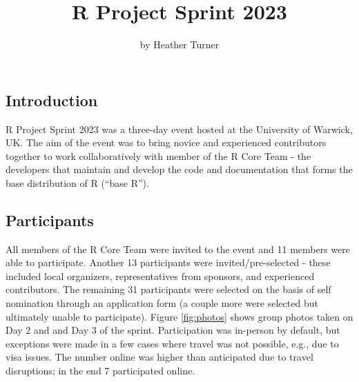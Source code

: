 \title{R Project Sprint 2023}
\author{by Heather Turner}

\maketitle


\hypertarget{introduction}{%
\subsection{Introduction}\label{introduction}}

R Project Sprint 2023 was a three-day event hosted at the University of Warwick,
UK. The aim of the event was to bring novice and experienced contributors
together to work collaboratively with member of the R Core Team - the developers
that maintain and develop the code and documentation that forms the base
distribution of R (``base R'').

\hypertarget{participants}{%
\subsection{Participants}\label{participants}}

All members of the R Core Team were invited to the event and 11 members were
able to participate. Another 13 participants were invited/pre-selected - these
included local organizers, representatives from sponsors, and experienced
contributors. The remaining 31 participants were selected on the basis of self
nomination through an application form (a couple more were selected but ultimately unable to participate). Figure \ref{fig:photos} shows group
photos taken on Day 2 and and Day 3 of the sprint. Participation was in-person
by default, but exceptions were made in a few cases where travel was not
possible, e.g., due to visa issues. The number online was higher than
anticipated due to travel disruptions; in the end 7 participated online.

